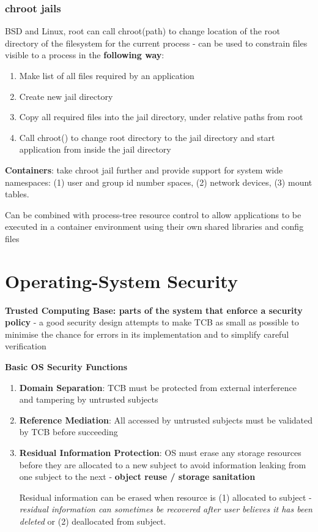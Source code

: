 \documentclass{article}
\newenvironment{definition}{\par\color{blue}}{\par}
\begin{document}
\subsubsection{chroot jails}
BSD and Linux, root can call chroot(path) to change location of the root directory of the filesystem for the current process - can be used to constrain files visible to a process in the \textbf{following way}:
\begin{enumerate}
	\item Make list of all files required by an application
	\item Create new jail directory
	\item Copy all required files into the jail directory, under relative paths from root
	\item Call chroot() to change root directory to the jail directory and start application from inside the jail directory
\end{enumerate} 


\textbf{Containers}: take chroot jail further and provide support for system wide namespaces: (1) user and group id number spaces, (2) network devices, (3) mount tables. 

Can be combined with process-tree resource control to allow applications to be executed in a container environment using their own shared libraries and config files 


\section{Operating-System Security}
\begin{definition}
\textbf{Trusted Computing Base: parts of the system that enforce a security policy} - a good security design attempts to make TCB as small as possible to minimise the chance for errors in its implementation and to simplify careful verification
\end{definition}

\bigskip
\noindent
\textbf{Basic OS Security Functions}
\begin{enumerate}
	\item \textbf{Domain Separation}: TCB must be protected from external interference and tampering by untrusted subjects
	\item \textbf{Reference Mediation}: All accessed by untrusted subjects must be validated by TCB before succeeding
	\item \textbf{Residual Information Protection}: OS must erase any storage resources before they are allocated to a new subject to avoid information leaking from one subject to the next - \textbf{object reuse / storage sanitation}
	
	Residual information can be erased when resource is (1) allocated to subject - \textit{residual information can sometimes be recovered after user believes it has been deleted} or (2) deallocated from subject. 
	
\end{enumerate}
\end{document}
